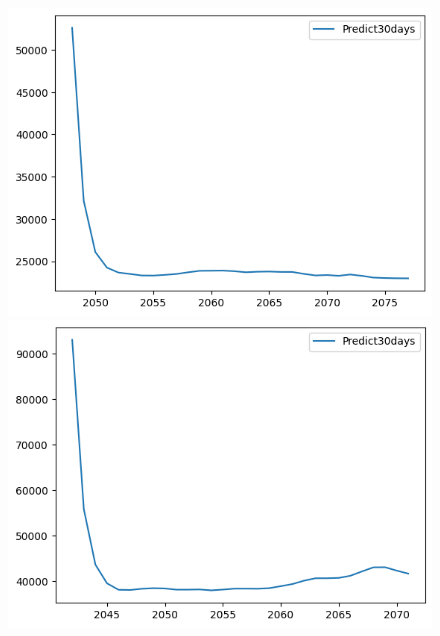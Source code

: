 \begin{figure}[H]
\begin{minipage}{0.15\textwidth}
    \end{minipage}
    \hfill
        \begin{minipage}{0.15\textwidth}
    \centering
    \includegraphics[width=1\textwidth]{resources/chapter-5/predicted/KF_BIDV_9_1_30days.png}
    \end{minipage}
    \hfill
    \begin{minipage}{0.15\textwidth}
    \centering
    \includegraphics[width=1\textwidth]{resources/chapter-5/predicted/KF_VCB_7_3_30days.png}
    \end{minipage}
    \hfill
    \begin{minipage}{0.15\textwidth}
    \centering

\end{minipage}
\end{figure}
